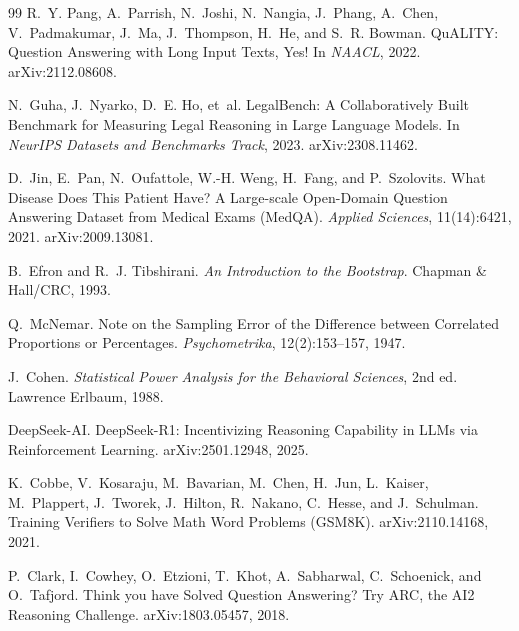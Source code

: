 \documentclass{article}
\begin{document}
\begin{thebibliography}{99}
R.~Y. Pang, A.~Parrish, N.~Joshi, N.~Nangia, J.~Phang, A.~Chen, V.~Padmakumar,
  J.~Ma, J.~Thompson, H.~He, and S.~R. Bowman.
\newblock QuALITY: Question Answering with Long Input Texts, Yes!
\newblock In \emph{NAACL}, 2022.
\newblock arXiv:2112.08608.

N.~Guha, J.~Nyarko, D.~E. Ho, et~al.
\newblock LegalBench: A Collaboratively Built Benchmark for Measuring Legal
  Reasoning in Large Language Models.
\newblock In \emph{NeurIPS Datasets and Benchmarks Track}, 2023.
\newblock arXiv:2308.11462.

D.~Jin, E.~Pan, N.~Oufattole, W.-H. Weng, H.~Fang, and P.~Szolovits.
\newblock What Disease Does This Patient Have? A Large-scale Open-Domain Question
  Answering Dataset from Medical Exams (MedQA).
\newblock \emph{Applied Sciences}, 11(14):6421, 2021.
\newblock arXiv:2009.13081.

B.~Efron and R.~J. Tibshirani.
\newblock \emph{An Introduction to the Bootstrap}.
\newblock Chapman \& Hall/CRC, 1993.

Q.~McNemar.
\newblock Note on the Sampling Error of the Difference between Correlated
  Proportions or Percentages.
\newblock \emph{Psychometrika}, 12(2):153--157, 1947.

J.~Cohen.
\newblock \emph{Statistical Power Analysis for the Behavioral Sciences}, 2nd ed.
\newblock Lawrence Erlbaum, 1988.

DeepSeek-AI.
\newblock DeepSeek-R1: Incentivizing Reasoning Capability in LLMs via
  Reinforcement Learning.
\newblock arXiv:2501.12948, 2025.

K.~Cobbe, V.~Kosaraju, M.~Bavarian, M.~Chen, H.~Jun, L.~Kaiser, M.~Plappert,
  J.~Tworek, J.~Hilton, R.~Nakano, C.~Hesse, and J.~Schulman.
\newblock Training Verifiers to Solve Math Word Problems (GSM8K).
\newblock arXiv:2110.14168, 2021.

P.~Clark, I.~Cowhey, O.~Etzioni, T.~Khot, A.~Sabharwal, C.~Schoenick, and
  O.~Tafjord.
\newblock Think you have Solved Question Answering? Try ARC, the AI2 Reasoning
  Challenge.
\newblock arXiv:1803.05457, 2018.

\end{thebibliography}
\end{document}
